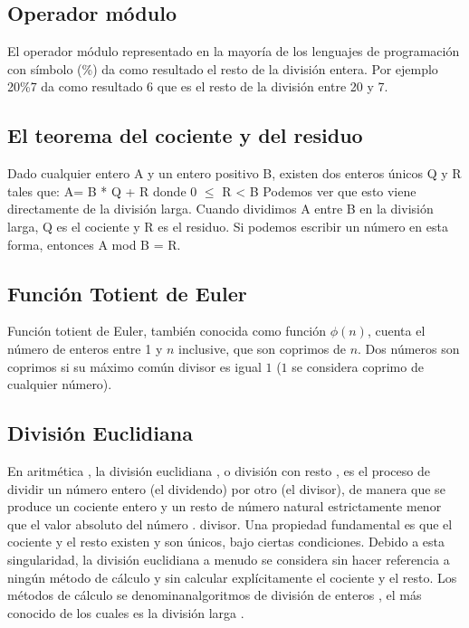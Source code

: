 \subsection{Operador módulo}

El operador módulo representado en la mayoría de los lenguajes de programación con símbolo (\%) da como resultado el resto de la división entera. Por ejemplo 20\%7 da como resultado 6 que es el resto de la división entre 20 y 7.

\subsection{El teorema del cociente y del residuo}

Dado cualquier entero A y un entero positivo B, existen dos enteros únicos Q y R tales que:
A= B * Q + R donde 0 $\leq$ R < B
Podemos ver que esto viene directamente de la división larga. Cuando dividimos A entre B en la división larga, Q es el cociente y R es el residuo. Si podemos escribir un número en esta forma, entonces A mod B = R.

\subsection{Función Totient de Euler}
Función totient de Euler, también conocida como función $\phi(n)$, cuenta el 
número de enteros entre 1 y $n$ inclusive, que son coprimos de $n$. Dos números 
son coprimos si su máximo común divisor es igual $1$ ($1$ se considera coprimo 
de cualquier número).

\subsection{División Euclidiana}
En aritmética , la división euclidiana , o división con resto , es el proceso de dividir un número entero (el dividendo) por otro (el divisor), de manera que se produce un cociente entero y un resto de número natural estrictamente menor que el valor absoluto del número . divisor. Una propiedad fundamental es que el cociente y el resto existen y son únicos, bajo ciertas condiciones. Debido a esta singularidad, la división euclidiana a menudo se considera sin hacer referencia a ningún método de cálculo y sin calcular explícitamente el cociente y el resto. Los métodos de cálculo se denominanalgoritmos de división de enteros , el más conocido de los cuales es la división larga .


